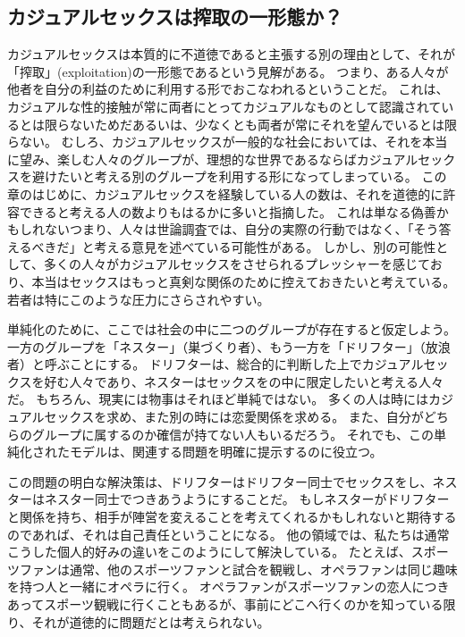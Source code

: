 \documentclass[paper=a4,book,openany]{jlreq} \usepackage{mystyle}
\begin{document}
\subsection{カジュアルセックスは搾取の一形態か？}

カジュアルセックスは本質的に不道徳であると主張する別の理由として、それが「搾取」(exploitation)の一形態であるという見解がある。
つまり、ある人々が他者を自分の利益のために利用する形でおこなわれるということだ。
これは、カジュアルな性的接触が常に両者にとってカジュアルなものとして認識されているとは限らないためだ{\DDASH}あるいは、少なくとも両者が常にそれを望んでいるとは限らない。
むしろ、カジュアルセックスが一般的な社会においては、それを本当に望み、楽しむ人々のグループが、理想的な世界であるならばカジュアルセックスを避けたいと考える別のグループを利用する形になってしまっている。
この章のはじめに、カジュアルセックスを経験している人の数は、それを道徳的に許容できると考える人の数よりもはるかに多いと指摘した。
これは単なる偽善かもしれない{\DDASH}つまり、人々は世論調査では、自分の実際の行動ではなく、「そう答えるべきだ」と考える意見を述べている可能性がある。
しかし、別の可能性として、多くの人々がカジュアルセックスをさせられるプレッシャーを感じており、本当はセックスはもっと真剣な関係のために控えておきたいと考えている。
若者は特にこのような圧力にさらされやすい。

単純化のために、ここでは社会の中に二つのグループが存在すると仮定しよう。
一方のグループを「ネスター」（巣づくり者）、もう一方を「ドリフター」（放浪者）と呼ぶことにする。
ドリフターは、総合的に判断した上でカジュアルセックスを好む人々であり、ネスターはセックスをの中に限定したいと考える人々だ。
もちろん、現実には物事はそれほど単純ではない。
多くの人は時にはカジュアルセックスを求め、また別の時には恋愛関係を求める。
また、自分がどちらのグループに属するのか確信が持てない人もいるだろう。
それでも、この単純化されたモデルは、関連する問題を明確に提示するのに役立つ。

この問題の明白な解決策は、ドリフターはドリフター同士でセックスをし、ネスターはネスター同士でつきあうようにすることだ。
もしネスターがドリフターと関係を持ち、相手が陣営を変えることを考えてくれるかもしれないと期待するのであれば、それは自己責任ということになる。
他の領域では、私たちは通常こうした個人的好みの違いをこのようにして解決している。
たとえば、スポーツファンは通常、他のスポーツファンと試合を観戦し、オペラファンは同じ趣味を持つ人と一緒にオペラに行く。
オペラファンがスポーツファンの恋人につきあってスポーツ観戦に行くこともあるが、事前にどこへ行くのかを知っている限り、それが道徳的に問題だとは考えられない。
\end{document}
